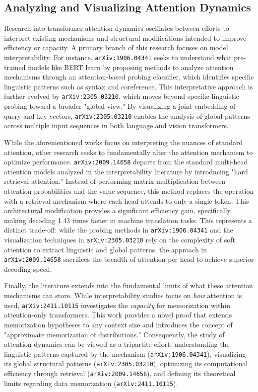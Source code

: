 \documentclass[11pt]{article}
\begin{document}
\subsection{Analyzing and Visualizing Attention Dynamics}

Research into transformer attention dynamics oscillates between efforts to interpret existing mechanisms and structural modifications intended to improve efficiency or capacity. A primary branch of this research focuses on model interpretability. For instance, \texttt{arXiv:1906.04341} seeks to understand what pre-trained models like BERT learn by proposing methods to analyze attention mechanisms through an attention-based probing classifier, which identifies specific linguistic patterns such as syntax and coreference. This interpretative approach is further evolved by \texttt{arXiv:2305.03210}, which moves beyond specific linguistic probing toward a broader "global view." By visualizing a joint embedding of query and key vectors, \texttt{arXiv:2305.03210} enables the analysis of global patterns across multiple input sequences in both language and vision transformers.

While the aforementioned works focus on interpreting the nuances of standard attention, other research seeks to fundamentally alter the attention mechanism to optimize performance. \texttt{arXiv:2009.14658} departs from the standard multi-head attention models analyzed in the interpretability literature by introducing "hard retrieval attention." Instead of performing matrix multiplication between attention probabilities and the value sequence, this method replaces the operation with a retrieval mechanism where each head attends to only a single token. This architectural modification provides a significant efficiency gain, specifically making decoding 1.43 times faster in machine translation tasks. This represents a distinct trade-off: while the probing methods in \texttt{arXiv:1906.04341} and the visualization techniques in \texttt{arXiv:2305.03210} rely on the complexity of soft attention to extract linguistic and global patterns, the approach in \texttt{arXiv:2009.14658} sacrifices the breadth of attention per head to achieve superior decoding speed.

Finally, the literature extends into the fundamental limits of what these attention mechanisms can store. While interpretability studies focus on \textit{how} attention is used, \texttt{arXiv:2411.10115} investigates the \textit{capacity} for memorization within attention-only transformers. This work provides a novel proof that extends memorization hypotheses to any context size and introduces the concept of "approximate memorization of distributions." Consequently, the study of attention dynamics can be viewed as a tripartite effort: understanding the linguistic patterns captured by the mechanism (\texttt{arXiv:1906.04341}), visualizing its global structural patterns (\texttt{arXiv:2305.03210}), optimizing its computational efficiency through retrieval (\texttt{arXiv:2009.14658}), and defining its theoretical limits regarding data memorization (\texttt{arXiv:2411.10115}).
\end{document}
